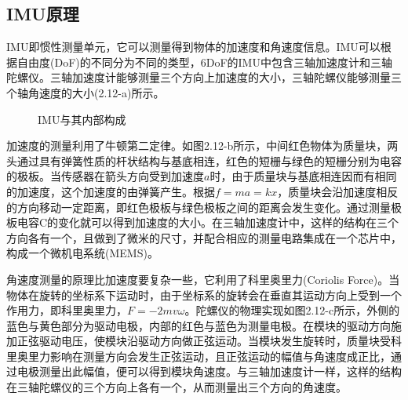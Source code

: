 \subsection{IMU原理}
IMU即惯性测量单元，它可以测量得到物体的加速度和角速度信息。IMU可以根据自由度(DoF)的不同分为不同的类型，6DoF的IMU中包含三轴加速度计和三轴陀螺仪。三轴加速度计能够测量三个方向上加速度的大小，三轴陀螺仪能够测量三个轴角速度的大小(2.12-a)所示。
\begin{figure}[htb]
    \caption{IMU与其内部构成}
    \label{fig:subfigss}
\end{figure}

加速度的测量利用了牛顿第二定律。如图2.12-b所示，中间红色物体为质量块，两头通过具有弹簧性质的杆状结构与基底相连，红色的短栅与绿色的短栅分别为电容的极板。当传感器在箭头方向受到加速度$a$时，由于质量块与基底相连因而有相同的加速度，这个加速度的由弹簧产生。根据$f=ma=kx$，质量块会沿加速度相反的方向移动一定距离，即红色极板与绿色极板之间的距离会发生变化。通过测量极板电容C的变化就可以得到加速度的大小。在三轴加速度计中，这样的结构在三个方向各有一个，且做到了微米的尺寸，并配合相应的测量电路集成在一个芯片中，构成一个微机电系统(MEMS)。

角速度测量的原理比加速度要复杂一些，它利用了科里奥里力(Coriolis Force)。当物体在旋转的坐标系下运动时，由于坐标系的旋转会在垂直其运动方向上受到一个作用力，即科里奥里力，$F=-2mvω$。陀螺仪的物理实现如图2.12-c所示，外侧的蓝色与黄色部分为驱动电极，内部的红色与蓝色为测量电极。在模块的驱动方向施加正弦驱动电压，使模块沿驱动方向做正弦运动。当模块发生旋转时，质量块受科里奥里力影响在测量方向会发生正弦运动，且正弦运动的幅值与角速度成正比，通过电极测量出此幅值，便可以得到模块角速度。与三轴加速度计一样，这样的结构在三轴陀螺仪的三个方向上各有一个，从而测量出三个方向的角速度。

